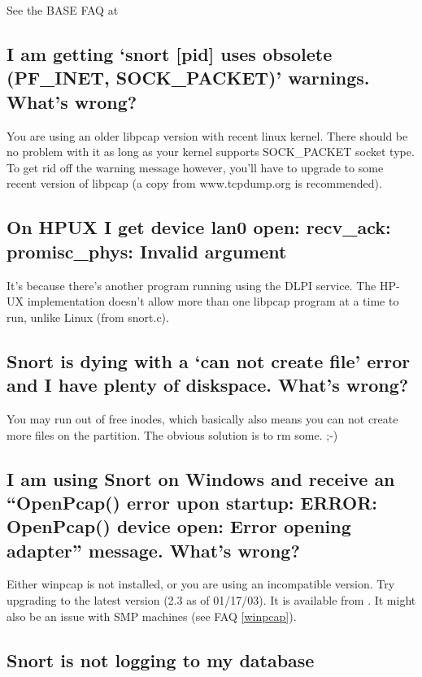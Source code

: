 \documentclass{article}
\newcommand{\myref}[1]{(see FAQ \ref{#1})}
\begin{document}
See the BASE FAQ at 

\subsection{I am getting `snort [pid] uses obsolete (PF\_INET, SOCK\_PACKET)' warnings. What's wrong?}

You are using an older libpcap version with recent linux kernel. There should be
no problem with it as long as your kernel supports SOCK\_PACKET socket 
type. To get rid off the warning message however, you'll have to upgrade 
to some recent version of libpcap (a copy from www.tcpdump.org is recommended).

\subsection{On HPUX I get device lan0 open: recv\_ack: promisc\_phys: Invalid argument}

It's because there's another program running using the DLPI service.
The HP-UX implementation doesn't allow more than one libpcap program
at a time to run, unlike Linux (from snort.c).

\subsection{Snort is dying with a `can not create file' error and I have plenty of diskspace. What's wrong?}

You may run out of free inodes, which basically also means you can not create
more files on the partition. The obvious solution is to rm some. ;-)

\subsection{I am using Snort on Windows and receive an ``OpenPcap() error upon startup: ERROR: OpenPcap() device open: Error opening adapter'' message. What's wrong? }

Either winpcap is not installed, or you are using an incompatible version.
Try upgrading to the latest version (2.3 as of 01/17/03).  It is available 
from .
It might also be an issue with SMP machines \myref{winpcap}.

\subsection{Snort is not logging to my database}
\end{document}
